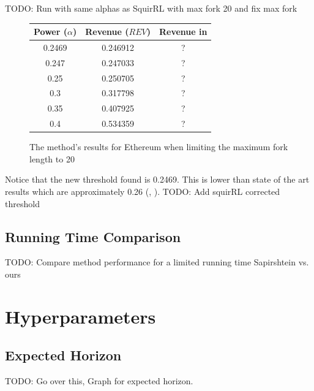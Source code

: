 \documentclass{article}
\newcommand{\rev}{\textit{REV}}
\begin{document}
TODO: Run with same alphas as SquirRL with max fork  20 and fix max fork
\begin{figure}[H]
	\centering
	\begin{tabular}{ |c|c|c| } 
		\hline
		 Power ($\alpha$) & Revenue ($\rev$) & Revenue in \cite{hou2019squirrl}\\
		 \hline
		 0.2469 & 0.246912 & ?\\
		 \hline
		 0.247 & 0.247033 & ?\\
		 \hline
		 0.25 & 0.250705 & ?\\
		 \hline
		 0.3 & 0.317798 & ?\\
		 \hline
		 0.35 & 0.407925 & ?\\
		 \hline
		 0.4 & 0.534359 & ?\\
		 \hline
	\end{tabular}
    \caption{The method's results for Ethereum when limiting the maximum fork length to 20}
    \label{fig:ethereum_results_table}
\end{figure}
Notice that the new threshold found is 0.2469. This is lower than state of the art results which are approximately 0.26 (\cite{ritz2018impact}, \cite{feng2019selfish}).
TODO: Add squirRL corrected threshold

\subsection{Running Time Comparison}
TODO: Compare method performance for a limited running time Sapirshtein vs. ours

\section{Hyperparameters}

\subsection{Expected Horizon}
TODO: Go over this, Graph for expected horizon.
\end{document}
